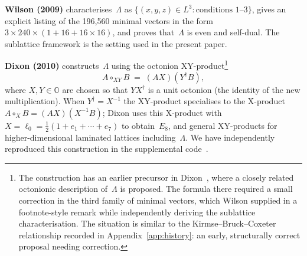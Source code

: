 \documentclass[twoside,english]{paper}
\numberwithin{equation}{section}
\numberwithin{figure}{section}
\theoremstyle{definition}
\theoremstyle{remark}
\newcommand{\OO}{\mathbb{O}}          %
\newcommand{\LL}{\Lambda}             %
\begin{document}
\textbf{Wilson (2009)} \cite{Wilson2009} characterises~$\LL$ as
$\{(x,y,z) \in L^3 : \text{conditions 1--3}\}$, gives an explicit
listing of the 196{,}560 minimal vectors in the form
$3 \times 240 \times (1 + 16 + 16 \times 16)$, and proves that~$\LL$
is even and self-dual.  The sublattice framework is
the setting used in the present paper.

\textbf{Dixon (2010)} \cite{Dixon2010} constructs~$\LL$ using the
octonion XY-product\footnote{The construction has an earlier precursor
in Dixon~\cite{Dixon1995}, where a closely related octonionic
description of~$\LL$ is proposed.  The formula there required a small
correction in the third family of minimal vectors, which Wilson
\cite[end of \S5]{Wilson2009} supplied in a footnote-style remark
while independently deriving the sublattice characterisation.  The
situation is similar to the Kirmse--Bruck--Coxeter relationship recorded
in Appendix~\ref{app:history}: an early, structurally correct proposal
needing correction.}
\[
  A \circ_{XY} B \;=\; (A X)(Y^{\dagger} B),
\]
where $X, Y \in \OO$ are chosen so that $Y X^{\dagger}$ is a unit
octonion (the identity of the new multiplication).  When $Y^{\dagger} = X^{-1}$
the XY-product specialises to the X-product $A \circ_X B = (AX)(X^{-1}
B)$; Dixon uses this X-product with $X = \ell_0 = \frac{1}{2}(1 + e_1
+ \cdots + e_7)$ to obtain~$E_8$, and general XY-products for
higher-dimensional laminated lattices including~$\LL$.  We have
independently reproduced this construction in the supplemental
code~\cite{repo}.
\end{document}
